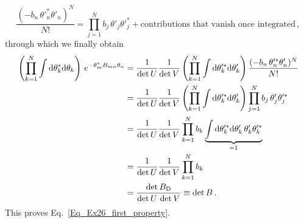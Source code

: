 \begin{sol}
    \begin{equation}
        \frac{(- b_{n}\, \theta'^{*}_{n} \theta'_{n})^N}{N!} = \prod_{j=1}^{N} b_{j}\, \theta'_{j} \theta'^{*}_{j} + \text{contributions that vanish once integrated} \, ,
    \end{equation}
    through which we finally obtain 
    \begin{align}
        \left(\prod_{k=1}^{N} \int \rmd \theta_k^{*} \rmd \theta_k \right) \, e^{-\theta_{m}^{*}B_{mn}\theta_{n}}
        = &\; \frac{1}{\det U}\frac{1}{\det V} \left(\prod_{k=1}^{N} \int \rmd \theta_k'^{*} \rmd\theta'_k \right) \frac{(- b_{n}\, \theta'^{*}_{n} \theta'_{n})^N}{N!} \nonumber\allowdisplaybreaks\\
        = &\; \frac{1}{\det U}\frac{1}{\det V} \left(\prod_{k=1}^{N} \int \rmd \theta_k'^{*} \rmd\theta'_k \right) \prod_{j=1}^{N} b_{j}\, \theta'_{j} \theta'^{*}_{j} \nonumber\allowdisplaybreaks\\
        = &\; \frac{1}{\det U}\frac{1}{\det V} \prod_{k=1}^{N} b_{k} \underbrace{\int \rmd \theta_k'^{*} \rmd\theta'_k  \, \theta'_{k} \theta'^{*}_{k}}_{= 1} \nonumber\allowdisplaybreaks\\
        = &\; \frac{1}{\det U}\frac{1}{\det V} \prod_{k=1}^{N} b_{k} \nonumber\allowdisplaybreaks\\
        = &\; \frac{\det B_{\rm D}}{\det U \, \det V} \equiv  \det B \, .
    \end{align}
    This proves Eq.~\eqref{Eq_Ex26_first_property}.
    

\end{sol}
